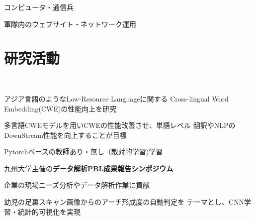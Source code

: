 \documentclass[]{deedy-resume-openfont}
\begin{document}
\begin{minipage}[t]{0.44\textwidth}
\begin{tightemize}
\item コンピュータ・通信兵
\item 軍隊内のウェブサイト・ネットワーク運用
\end{tightemize}



%
%

\end{minipage} 
\hfill
\begin{minipage}[t]{0.55\textwidth} 


\section{研究活動}
\\
\vspace{\topsep} %
\begin{tightemize}
\item アジア言語のようなLow-Resource Languageに関する
Cross-lingual Word Embedding(CWE)の性能向上を研究
\item 多言語CWEモデルを用いCWEの性能改善させ、単語レベル
翻訳やNLPのDownStream性能を向上することが目標
\item Pytorchベースの教師あり・無し（敵対的学習)学習
\end{tightemize}
\sectionsep

\begin{tightemize}
\item 九州大学主催の\textbf{\href{https://ads.i.kyushu-u.ac.jp/archives/1642}{データ解析PBL成果報告シンポジウム}}
\item 企業の現場ニーズ分析やデータ解析作業に貢献
\item 幼児の足裏スキャン画像からのアーチ形成度の自動判定を
テーマとし、CNN学習・統計的可視化を実現
\end{tightemize}
\sectionsep




\end{minipage}
\end{document}

